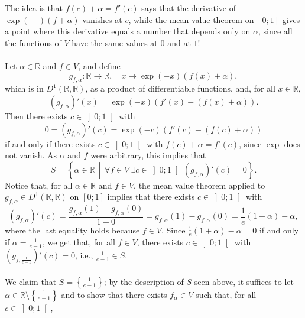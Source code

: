 \begin{solution}
    The idea is that \( f\left(c\right)+\alpha = f'\left(c\right) \) says that the derivative of \( \exp\left(-\_\right)\left(f+\alpha\right) \) vanishes at \( c \), while the mean value theorem on \( \left[0;1\right] \) gives a point where this derivative equals a number that depends only on \( \alpha \), since all the functions of \( V \) have the same values at \( 0 \) and at \( 1 \)!
    \\\\
    Let \( \alpha \in \mathbb{R} \) and \( f \in V \), and define
    \[
        g_{f,\alpha} \colon \mathbb{R} \longrightarrow \mathbb{R}, \quad x \longmapsto \exp\left(-x\right)\left(f\left(x\right)+\alpha\right),
    \]
    which is in \( D^1\left(\mathbb{R},\mathbb{R}\right) \), as a product of differentiable functions, and, for all \( x \in \mathbb{R} \),
    \[
        \left(g_{f,\alpha}\right)'\left(x\right) = \exp\left(-x\right)\left(f'\left(x\right)-\left(f\left(x\right)+\alpha\right)\right).
    \]
    Then there exists \( c \in \left]0;1\right[ \) with
    \[
        0 = \left(g_{f,\alpha}\right)'\left(c\right) = \exp\left(-c\right)\left(f'\left(c\right)-\left(f\left(c\right)+\alpha\right)\right)
    \]
    if and only if there exists \( c \in \left]0;1\right[ \) with \( f\left(c\right)+\alpha = f'\left(c\right) \), since \( \exp \) does not vanish. As \( \alpha \) and \( f \) were arbitrary, this implies that
    \[
    S = \left\{ \alpha \in \mathbb{R} \,\middle|\, \forall f \in V \ \exists c \in \left]0;1\right[ \ \left(g_{f,\alpha}\right)'\left(c\right) = 0 \right\}.
    \]
    Notice that, for all \( \alpha \in \mathbb{R} \) and \( f \in V \), the mean value theorem applied to \( g_{f,\alpha} \in D^1\left(\mathbb{R},\mathbb{R}\right) \) on \( \left[0;1\right] \) implies that there exists \( c \in \left]0;1\right[ \) with
    \[
        \left(g_{f,\alpha}\right)'\left(c\right) = \frac{g_{f,\alpha}\left(1\right)-g_{f,\alpha}\left(0\right)}{1-0} = g_{f,\alpha}\left(1\right)-g_{f,\alpha}\left(0\right) = \frac{1}{e}\left(1+\alpha\right)-\alpha,
    \]
    where the last equality holds because \( f \in V \). Since \( \frac{1}{e}\left(1+\alpha\right)-\alpha = 0 \) if and only if \( \alpha = \frac{1}{e-1} \), we get that, for all \( f \in V \), there exists \( c \in \left]0;1\right[ \) with \( \left(g_{f,\frac{1}{e-1}}\right)'\left(c\right) = 0 \), i.e., \( \frac{1}{e-1} \in S \).
    \\\\
    We claim that \( S = \left\{\frac{1}{e-1}\right\} \); by the description of \( S \) seen above, it suffices to let \( \alpha \in \mathbb{R} \setminus \left\{\frac{1}{e-1}\right\} \) and to show that there exists \( f_\alpha \in V \) such that, for all \( c \in \left]0;1\right[ \),

\end{solution}

